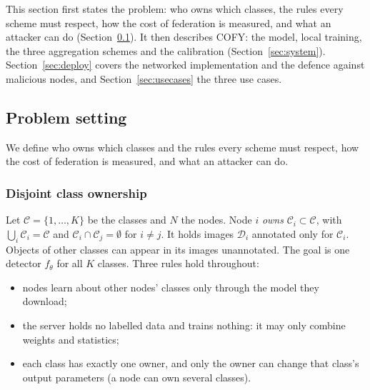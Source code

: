 \documentclass[pdflatex,sn-mathphys-num]{sn-jnl}
\newcommand{\sys}{COFY}
\begin{document}
This section first states the problem: who owns which classes, the rules every scheme must respect, how the cost of federation is measured, and what an attacker can do (Section~\ref{sec:problem}). It then describes \sys{}: the model, local training, the three aggregation schemes and the calibration (Section~\ref{sec:system}). Section~\ref{sec:deploy} covers the networked implementation and the defence against malicious nodes, and Section~\ref{sec:usecases} the three use cases.

\subsection{Problem setting}\label{sec:problem}
We define who owns which classes and the rules every scheme must respect, how the cost of federation is measured, and what an attacker can do.

\subsubsection{Disjoint class ownership}
Let $\mathcal{C}=\{1,\dots,K\}$ be the classes and $N$ the nodes. Node $i$ \emph{owns} $\mathcal{C}_i\subset\mathcal{C}$, with $\bigcup_i\mathcal{C}_i=\mathcal{C}$ and $\mathcal{C}_i\cap\mathcal{C}_j=\emptyset$ for $i\neq j$. It holds images $\mathcal{D}_i$ annotated only for $\mathcal{C}_i$. Objects of other classes can appear in its images unannotated. The goal is one detector $f_\theta$ for all $K$ classes. Three rules hold throughout:
\begin{itemize}
\item[R1] nodes learn about other nodes' classes only through the model they download;
\item[R2] the server holds no labelled data and trains nothing: it may only combine weights and statistics;
\item[R3] each class has exactly one owner, and only the owner can change that class's output parameters (a node can own several classes).
\end{itemize}
\end{document}
